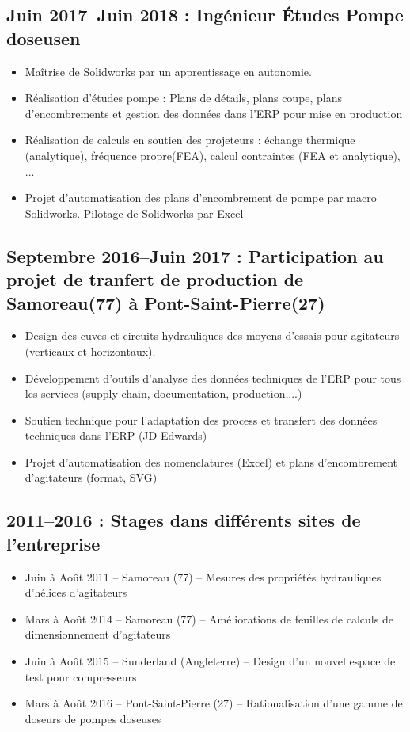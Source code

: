 \documentclass[10pt,a4paper,sans]{article}
\begin{document}
\begin{minipage}[t]{0.72\textwidth}
    \subsection{Juin 2017--Juin 2018 : Ingénieur Études Pompe doseusen}
    \begin{itemize}
        \item Maîtrise de Solidworks par un apprentissage en autonomie.
        \item Réalisation d’études pompe : Plans de détails, plans coupe, plans d’encombrements et gestion des données dans l’ERP pour mise en production
        \item Réalisation de calculs en soutien des projeteurs : échange thermique (analytique), fréquence propre(FEA), calcul contraintes (FEA et analytique), ...
        \item Projet d’automatisation des plans d’encombrement de pompe par macro Solidworks. Pilotage de Solidworks par Excel
    \end{itemize}

    \subsection{Septembre 2016--Juin 2017 : Participation au projet de tranfert de production de Samoreau(77) à Pont-Saint-Pierre(27)}
    \begin{itemize}
        \item Design des cuves et circuits hydrauliques des moyens d’essais pour agitateurs (verticaux et horizontaux).
        \item Développement d’outils d’analyse des données techniques de l’ERP pour tous les services (supply chain, documentation, production,...)
        \item Soutien technique pour l’adaptation des process et transfert des données techniques dans l’ERP (JD Edwards)
        \item Projet d’automatisation des nomenclatures (Excel) et plans d’encombrement d’agitateurs (format, SVG)
    \end{itemize}


    \subsection{2011--2016 : Stages dans différents sites de l'entreprise}
    \begin{itemize}
        \item Juin à Août 2011 – Samoreau (77) – Mesures des propriétés hydrauliques d’hélices d’agitateurs
        \item Mars à Août 2014 – Samoreau (77) – Améliorations de feuilles de calculs de dimensionnement d’agitateurs
        \item Juin à Août 2015 – Sunderland (Angleterre) – Design d’un nouvel espace de test pour compresseurs
        \item Mars à Août 2016 – Pont-Saint-Pierre (27) – Rationalisation d’une gamme de doseurs de pompes doseuses
    \end{itemize}
\end{minipage}
\end{document}
